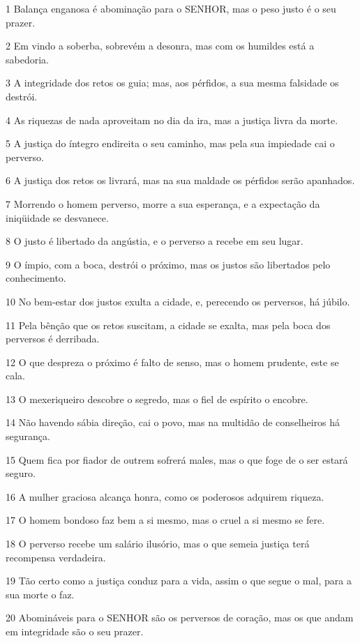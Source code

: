 \par 1 Balança enganosa é abominação para o SENHOR, mas o peso justo é o seu prazer.
\par 2 Em vindo a soberba, sobrevém a desonra, mas com os humildes está a sabedoria.
\par 3 A integridade dos retos os guia; mas, aos pérfidos, a sua mesma falsidade os destrói.
\par 4 As riquezas de nada aproveitam no dia da ira, mas a justiça livra da morte.
\par 5 A justiça do íntegro endireita o seu caminho, mas pela sua impiedade cai o perverso.
\par 6 A justiça dos retos os livrará, mas na sua maldade os pérfidos serão apanhados.
\par 7 Morrendo o homem perverso, morre a sua esperança, e a expectação da iniqüidade se desvanece.
\par 8 O justo é libertado da angústia, e o perverso a recebe em seu lugar.
\par 9 O ímpio, com a boca, destrói o próximo, mas os justos são libertados pelo conhecimento.
\par 10 No bem-estar dos justos exulta a cidade, e, perecendo os perversos, há júbilo.
\par 11 Pela bênção que os retos suscitam, a cidade se exalta, mas pela boca dos perversos é derribada.
\par 12 O que despreza o próximo é falto de senso, mas o homem prudente, este se cala.
\par 13 O mexeriqueiro descobre o segredo, mas o fiel de espírito o encobre.
\par 14 Não havendo sábia direção, cai o povo, mas na multidão de conselheiros há segurança.
\par 15 Quem fica por fiador de outrem sofrerá males, mas o que foge de o ser estará seguro.
\par 16 A mulher graciosa alcança honra, como os poderosos adquirem riqueza.
\par 17 O homem bondoso faz bem a si mesmo, mas o cruel a si mesmo se fere.
\par 18 O perverso recebe um salário ilusório, mas o que semeia justiça terá recompensa verdadeira.
\par 19 Tão certo como a justiça conduz para a vida, assim o que segue o mal, para a sua morte o faz.
\par 20 Abomináveis para o SENHOR são os perversos de coração, mas os que andam em integridade são o seu prazer.
